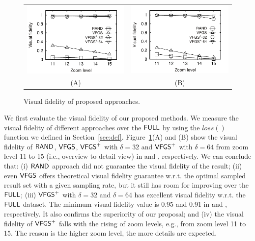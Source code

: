 \begin{figure}
 \centering
 \small
 \begin{tabular}{cc}
   \includegraphics[width=0.44\columnwidth]{pictures/fporto}
   &
   \includegraphics[width=0.44\columnwidth]{pictures/fshenzhen}
   \\
   (A) \pt{}
   &
   (B) \sz{}
 \end{tabular}
 \vspace{-3mm}
 \caption{Visual fidelity of proposed approaches.}
 \label{fig:fidelity}
 \vspace{-4mm}
\end{figure}

We first evaluate the visual fidelity of our proposed methods.
We measure the visual fidelity of different approaches over the $\mathsf{FULL}$ by using the $loss()$ function we defined in Section~\ref{sec:def}.
Figure~\ref{fig:fidelity}(A) and (B) show the visual fidelity of $\mathsf{RAND}$, $\mathsf{VFGS}$, $\mathsf{VFGS}^{+}$ with $\delta=32$ and $\mathsf{VFGS}^{+}$ with $\delta=64$ from zoom level 11 to 15 (i.e., overview to detail view) in
\pt{} and \sz{}, respectively.
We can conclude that: (i) $\mathsf{RAND}$ approach did not guarantee the visual fidelity of the result;
(ii) even $\mathsf{VFGS}$ offers theoretical visual fidelity guarantee w.r.t. the optimal sampled result set with a given sampling rate, but it still has room for improving over the $\mathsf{FULL}$;
(iii) $\mathsf{VFGS}^{+}$ with $\delta=32$ and $\delta=64$ has excellent visual fidelity w.r.t. the $\mathsf{FULL}$ dataset. The minimum visual fidelity value is 0.95 and 0.91 in \pt{} and \sz{}, respectively.
It also confirms the superiority of our proposal;
and (iv) the visual fidelity of $\mathsf{VFGS}^{+}$ falls with the rising of zoom levels, e.g., from zoom level 11 to 15.
The reason is the higher zoom level, the more details are expected.


